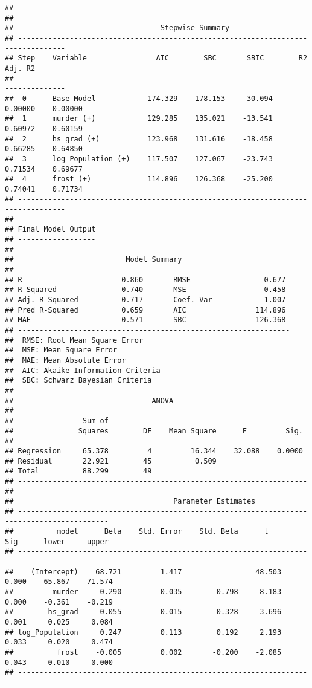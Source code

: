 \documentclass[
]{article}
\begin{document}
\begin{verbatim}
## 
## 
##                                  Stepwise Summary                                  
## ---------------------------------------------------------------------------------
## Step    Variable                AIC        SBC       SBIC        R2       Adj. R2 
## ---------------------------------------------------------------------------------
##  0      Base Model            174.329    178.153     30.094    0.00000    0.00000 
##  1      murder (+)            129.285    135.021    -13.541    0.60972    0.60159 
##  2      hs_grad (+)           123.968    131.616    -18.458    0.66285    0.64850 
##  3      log_Population (+)    117.507    127.067    -23.743    0.71534    0.69677 
##  4      frost (+)             114.896    126.368    -25.200    0.74041    0.71734 
## ---------------------------------------------------------------------------------
## 
## Final Model Output 
## ------------------
## 
##                          Model Summary                          
## ---------------------------------------------------------------
## R                       0.860       RMSE                 0.677 
## R-Squared               0.740       MSE                  0.458 
## Adj. R-Squared          0.717       Coef. Var            1.007 
## Pred R-Squared          0.659       AIC                114.896 
## MAE                     0.571       SBC                126.368 
## ---------------------------------------------------------------
##  RMSE: Root Mean Square Error 
##  MSE: Mean Square Error 
##  MAE: Mean Absolute Error 
##  AIC: Akaike Information Criteria 
##  SBC: Schwarz Bayesian Criteria 
## 
##                                ANOVA                                
## -------------------------------------------------------------------
##                Sum of                                              
##               Squares        DF    Mean Square      F         Sig. 
## -------------------------------------------------------------------
## Regression     65.378         4         16.344    32.088    0.0000 
## Residual       22.921        45          0.509                     
## Total          88.299        49                                    
## -------------------------------------------------------------------
## 
##                                     Parameter Estimates                                     
## -------------------------------------------------------------------------------------------
##          model      Beta    Std. Error    Std. Beta      t        Sig      lower     upper 
## -------------------------------------------------------------------------------------------
##    (Intercept)    68.721         1.417                 48.503    0.000    65.867    71.574 
##         murder    -0.290         0.035       -0.798    -8.183    0.000    -0.361    -0.219 
##        hs_grad     0.055         0.015        0.328     3.696    0.001     0.025     0.084 
## log_Population     0.247         0.113        0.192     2.193    0.033     0.020     0.474 
##          frost    -0.005         0.002       -0.200    -2.085    0.043    -0.010     0.000 
## -------------------------------------------------------------------------------------------
\end{verbatim}
\end{document}

